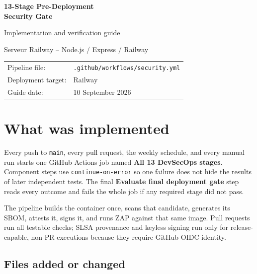 \documentclass[11pt,a4paper]{article}
\begin{document}
\begin{titlepage}
\pagecolor{navy}
\color{white}
\vspace*{25mm}
{\Huge\bfseries 13-Stage Pre-Deployment\\[3mm]Security Gate\par}
\vspace{8mm}
{\Large Implementation and verification guide\par}
\vspace{4mm}
{\large Serveur Railway -- Node.js / Express / Railway\par}
\vfill
\begin{tabular}{ll}
Pipeline file: & \texttt{.github/workflows/security.yml}\\
Deployment target: & Railway\\
Guide date: & 10 September 2026\\
\end{tabular}
\vspace{20mm}
\end{titlepage}
\nopagecolor
\color{black}

\tableofcontents
\newpage

\section{What was implemented}

Every push to \texttt{main}, every pull request, the weekly schedule, and every manual run starts one GitHub Actions job named \textbf{All 13 DevSecOps stages}. Component steps use \texttt{continue-on-error} so one failure does not hide the results of later independent tests. The final \textbf{Evaluate final deployment gate} step reads every outcome and fails the whole job if any required stage did not pass.

The pipeline builds the container once, scans that candidate, generates its SBOM, attests it, signs it, and runs ZAP against that same image. Pull requests run all testable checks; SLSA provenance and keyless signing run only for release-capable, non-PR executions because they require GitHub OIDC identity.

\subsection{Files added or changed}
\end{document}
